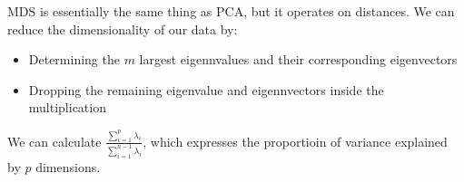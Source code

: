 MDS is essentially the same thing as PCA, but it operates on distances. We can reduce the dimensionality of our data by:
\begin{itemize}
    \item
        Determining the \(m\) largest eigennvalues and their corresponding eigenvectors
    \item
        Dropping the remaining eigenvalue and eigennvectors inside the multiplication
\end{itemize}

We can calculate \(\frac{\sum_{i=1}^p \lambda_i}{\sum_{i=1}^{n-1} \lambda_i}\), which expresses the proportioin of variance explained by \(p\) dimensions.
